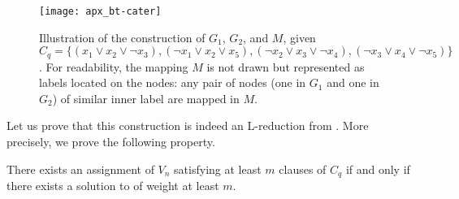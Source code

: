 		\begin{figure}[ht]
    	 	 \centering
    	 	 \texttt{[image: apx\_bt-cater]}
    	 	 \caption[Illustration of the construction of $G_1$, $G_2$, and $M$, given $C_q$ (1)]{Illustration of the construction of $G_1$, $G_2$, and $M$, given $C_q = \{(x_1 \vee x_2 \vee \neg{}x_3), (\neg{}x_1 \vee x_2 \vee x_5), (\neg{}x_2 \vee x_3 \vee \neg{}x_4), (\neg{}x_3 \vee x_4 \vee \neg{}x_5)\}$. For readability, the mapping $M$ is not drawn but represented as labels located on the nodes: any pair of nodes (one in $G_1$ and one in $G_2$) of similar inner label are mapped in $M$.}
			\label{fig:bt-cater}
		\end{figure}

		Let us prove that this construction is indeed an L-reduction from \msat{}. More precisely, we prove the following property.
		\begin{lemma}
		There exists an assignment of $V_n$ satisfying at least $m$ clauses of $C_q$ if and only if there exists a solution to \mwccs{} of weight at least $m$.
		\end{lemma}

